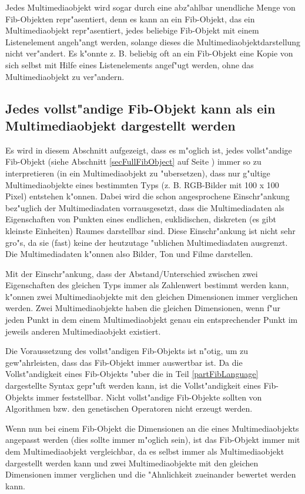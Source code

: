 \bigskip\noindent
Jedes Multimediaobjekt wird sogar durch eine abz"ahlbar unendliche Menge von Fib-Objekten repr"asentiert, denn es kann an ein Fib-Objekt, das ein Multimediaobjekt repr"asentiert, jedes beliebige Fib-Objekt mit einem Listenelement angeh"angt werden, solange dieses die Multimediaobjektdarstellung nicht ver"andert. Es k"onnte z. B. beliebig oft an ein Fib-Objekt eine Kopie von sich selbst mit Hilfe eines Listenelements angef"ugt werden, ohne das Multimediaobjekt zu ver"andern.


\subsection{Jedes vollst"andige Fib-Objekt kann als ein Multimediaobjekt dargestellt werden}
\label{alleBilder}

Es wird in diesem Abschnitt aufgezeigt, dass es m"oglich ist, jedes vollst"andige Fib-Objekt (siehe Abschnitt \ref{secFullFibObject} auf Seite \pageref{secFullFibObject}) immer so zu interpretieren (in ein Multimediaobjekt zu "ubersetzen), dass nur g"ultige Multimediaobjekte eines bestimmten Typs (z. B. RGB-Bilder mit 100 x 100 Pixel) entstehen k"onnen. Dabei wird die schon angesprochene Einschr"ankung bez"uglich der Multimediadaten vorrausgesetzt, dass die Multimediadaten als Eigenschaften von Punkten eines endlichen, euklidischen, diskreten (es gibt kleinste Einheiten) Raumes darstellbar sind. Diese Einschr"ankung ist nicht sehr gro"s, da sie (fast) keine der heutzutage "ublichen Multimediadaten ausgrenzt. Die Multimediadaten k"onnen also Bilder, Ton und Filme darstellen.

Mit der Einschr"ankung, dass der Abstand/Unterschied zwischen zwei Eigenschaften des gleichen Typs immer als Zahlenwert bestimmt werden kann, k"onnen zwei Multimediaobjekte mit den gleichen Dimensionen immer verglichen werden. Zwei Multimediaobjekte haben die gleichen Dimensionen, wenn f"ur jeden Punkt in dem einem Multimediaobjekt genau ein entsprechender Punkt im jeweils anderen Multimediaobjekt existiert.

Die Voraussetzung des vollst"andigen Fib-Objekts ist n"otig, um zu gew"ahrleisten, dass das Fib-Objekt immer auswertbar ist. Da die Vollst"andigkeit eines Fib-Objekts "uber die in Teil \ref{partFibLanguage} dargestellte Syntax gepr"uft werden kann, ist die Vollst"andigkeit eines Fib-Objekts immer feststellbar. Nicht vollst"andige Fib-Objekte sollten von Algorithmen bzw. den genetischen Operatoren nicht erzeugt werden.

Wenn nun bei einem Fib-Objekt die Dimensionen an die eines Multimediaobjekts angepasst werden (dies sollte immer m"oglich sein), ist das Fib-Objekt immer mit dem Multimediaobjekt vergleichbar, da es selbst immer als Multimediaobjekt dargestellt werden kann und zwei Multimediaobjekte mit den gleichen Dimensionen immer verglichen und die "Ahnlichkeit zueinander bewertet werden kann.

